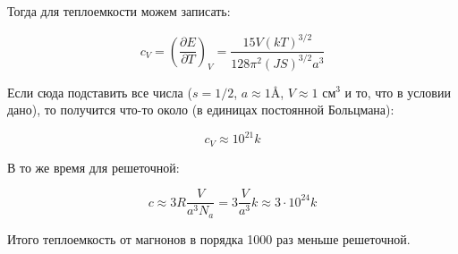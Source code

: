 \documentclass[a4paper, 12pt]{article}
\begin{document}
Тогда для теплоемкости можем записать:

\begin{equation}
	c_V = \left(\frac{\partial E}{\partial T}\right)_V = \frac{15 V (k T)^{3/2}}{128 \pi^2 (JS)^{3/2}a^3}
\end{equation}

Если сюда подставить все числа ($s = 1/2$, $a \approx 1$\AA, $V \approx 1\text{ см}^3$ и то, что в условии дано), то получится что-то около (в единицах постоянной Больцмана): 

\begin{equation}
	c_V \approx 10^{21} k
\end{equation}

В то же время для решеточной:

\begin{equation}
	c \approx 3R \frac{V}{a^3 N_a} = 3 \frac{V}{a^3} k \approx 3 \cdot 10^{24} k 
\end{equation}

Итого теплоемкость от магнонов в порядка 1000 раз меньше решеточной.
\end{document}
